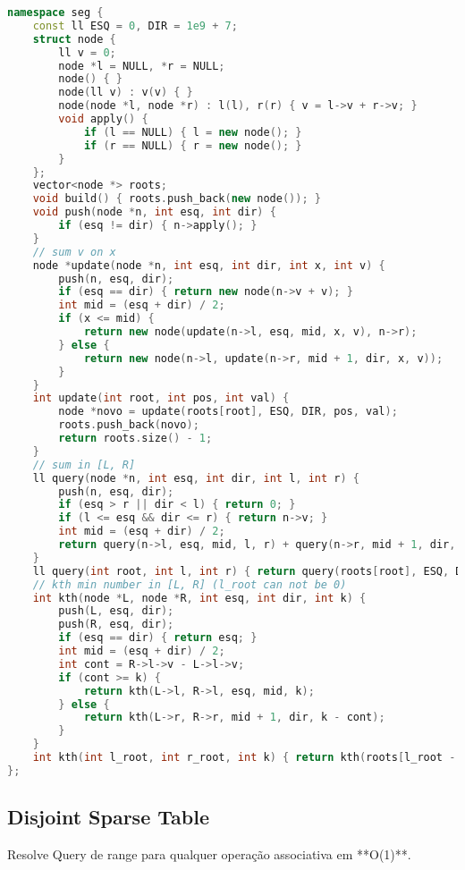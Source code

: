 \documentclass[11pt, a4paper, twoside]{article}
\begin{document}
\begin{lstlisting}[language=C++]
namespace seg {
    const ll ESQ = 0, DIR = 1e9 + 7;
    struct node {
        ll v = 0;
        node *l = NULL, *r = NULL;
        node() { }
        node(ll v) : v(v) { }
        node(node *l, node *r) : l(l), r(r) { v = l->v + r->v; }
        void apply() {
            if (l == NULL) { l = new node(); }
            if (r == NULL) { r = new node(); }
        }
    };
    vector<node *> roots;
    void build() { roots.push_back(new node()); }
    void push(node *n, int esq, int dir) {
        if (esq != dir) { n->apply(); }
    }
    // sum v on x
    node *update(node *n, int esq, int dir, int x, int v) {
        push(n, esq, dir);
        if (esq == dir) { return new node(n->v + v); }
        int mid = (esq + dir) / 2;
        if (x <= mid) {
            return new node(update(n->l, esq, mid, x, v), n->r);
        } else {
            return new node(n->l, update(n->r, mid + 1, dir, x, v));
        }
    }
    int update(int root, int pos, int val) {
        node *novo = update(roots[root], ESQ, DIR, pos, val);
        roots.push_back(novo);
        return roots.size() - 1;
    }
    // sum in [L, R]
    ll query(node *n, int esq, int dir, int l, int r) {
        push(n, esq, dir);
        if (esq > r || dir < l) { return 0; }
        if (l <= esq && dir <= r) { return n->v; }
        int mid = (esq + dir) / 2;
        return query(n->l, esq, mid, l, r) + query(n->r, mid + 1, dir, l, r);
    }
    ll query(int root, int l, int r) { return query(roots[root], ESQ, DIR, l, r); }
    // kth min number in [L, R] (l_root can not be 0)
    int kth(node *L, node *R, int esq, int dir, int k) {
        push(L, esq, dir);
        push(R, esq, dir);
        if (esq == dir) { return esq; }
        int mid = (esq + dir) / 2;
        int cont = R->l->v - L->l->v;
        if (cont >= k) {
            return kth(L->l, R->l, esq, mid, k);
        } else {
            return kth(L->r, R->r, mid + 1, dir, k - cont);
        }
    }
    int kth(int l_root, int r_root, int k) { return kth(roots[l_root - 1], roots[r_root], ESQ, DIR, k); }
};
\end{lstlisting}

\subsection{Disjoint Sparse Table}



Resolve Query de range para qualquer operação associativa em **O(1)**.
\end{document}
